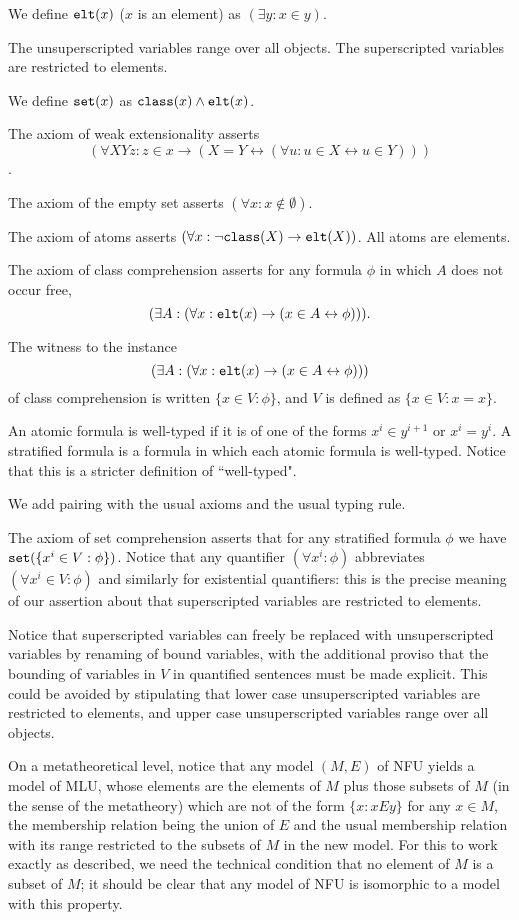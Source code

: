 \documentclass[12pt]{article}
\begin{document}
We define ${\tt elt}(x)$ ($x$ is an element) as $(\exists y:x\in y)$.

The unsuperscripted variables range over all objects.  The superscripted variables are restricted to elements.

We define ${\tt set}(x)$ as ${\tt class}(x) \wedge {\tt elt}(x)$.

The axiom of weak extensionality asserts $$(\forall XYz:z \in x \rightarrow (X=Y \leftrightarrow (\forall u:u \in X \leftrightarrow u \in Y)))$$.

The axiom of the empty set asserts $(\forall x:x \not\in \emptyset)$.

The axiom of atoms asserts  $(\forall x:\neg{\tt class}(X) \rightarrow {\tt elt}(X))$.  All atoms are elements.

The axiom of class comprehension asserts for any formula $\phi$ in which $A$ does not occur free,
$$(\exists A:(\forall x:{\tt elt}(x) \rightarrow (x \in A \leftrightarrow \phi))).$$

The witness to the instance $$(\exists A:(\forall x:{\tt elt}(x) \rightarrow (x \in A \leftrightarrow \phi)))$$  of  class comprehension is written $\{x \in V:\phi\}$, and $V$
is defined as $\{x \in V:x=x\}$.

An atomic formula is well-typed if it is of one of the forms $x^i \in y^{i+1}$ or $x^i=y^i$.  A stratified formula is a formula in which each atomic formula is well-typed.  Notice
that this is a stricter definition of ``well-typed".

We add pairing with the usual axioms and the usual typing rule.

The axiom of set comprehension asserts that for any stratified formula $\phi$ we have ${\tt set}(\{x^i \in V:\phi\})$.  Notice that any quantifier $(\forall x^i:\phi)$ abbreviates
$(\forall x^i\in V:\phi)$ and similarly for existential quantifiers:  this is the precise meaning of our assertion about that superscripted variables are restricted to elements.

Notice that superscripted variables can freely be replaced with unsuperscripted variables by renaming of bound variables, with the additional proviso that the bounding of
variables in $V$ in quantified sentences must be made explicit.  This could be avoided by stipulating that lower case unsuperscripted variables are restricted to elements, and upper case
unsuperscripted variables range over all objects.

On a metatheoretical level, notice that any model $(M,E)$ of NFU yields a model of MLU, whose elements are the elements of $M$ plus those subsets of $M$ (in the sense of the metatheory)
which are not of the form $\{x:x E y\}$ for any $x \in M$, the membership relation being the union of $E$ and the usual membership relation with its range restricted to the subsets
of $M$ in the new model.  For this to work exactly as described, we need the technical condition that no element of $M$ is a subset of $M$;  it should be clear that any model of NFU
is isomorphic to a model with this property.
\end{document}
